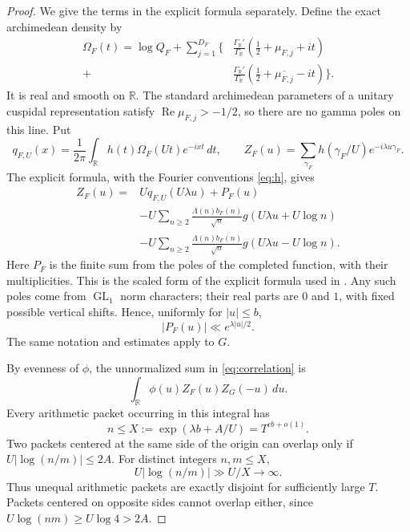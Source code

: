 \documentclass[11pt]{article}
\numberwithin{equation}{section}
\theoremstyle{remark}
\newcommand{\R}{\mathbb R}
\newcommand{\Rea}{\operatorname{Re}}
\newcommand{\GL}{\operatorname{GL}}
\begin{document}
\begin{proof}
We give the terms in the explicit formula separately. Define the exact
archimedean density by
\begin{equation}\label{eq:Omega}
\begin{split}
 \Omega_F(t)=\log Q_F+\sum_{j=1}^{D_F}\bigg\{
 &\frac{\Gamma_\R'}{\Gamma_\R}
             (\tfrac12+\mu_{F,j}+it)\\
 +&\frac{\Gamma_\R'}{\Gamma_\R}
             (\tfrac12+\overline{\mu_{F,j}}-it)\bigg\}.
\end{split}
\end{equation}
It is real and smooth on $\R$. The standard archimedean parameters of
a unitary cuspidal representation satisfy $\Rea\mu_{F,j}>-1/2$,
so there are no gamma poles on this line. Put
\[
 q_{F,U}(x)=\frac1{2\pi}\int_\R
                   h(t)\Omega_F(Ut)e^{-ixt}\,dt,
 \qquad Z_F(u)=\sum_{\gamma_F}h(\gamma_F/U)e^{-i\lambda u\gamma_F}.
\]
The explicit formula, with the Fourier conventions
\eqref{eq:h}, gives
\begin{equation}\label{eq:EF}
\begin{split}
 Z_F(u)={}&Uq_{F,U}(U\lambda u)+P_F(u)\\
 &-U\sum_{n\geq2}\frac{\Lambda(n)b_F(n)}{\sqrt n}
                          g(U\lambda u+U\log n)\\
 &-U\sum_{n\geq2}\frac{\Lambda(n)\overline{b_F(n)}}{\sqrt n}
                          g(U\lambda u-U\log n).
\end{split}
\end{equation}
Here $P_F$ is the finite sum from the poles of the completed function,
with their multiplicities. This is the scaled form of the explicit
formula used in \cite{RS}. Any such poles come from $\GL_1$ norm
characters; their real parts are $0$ and $1$, with fixed possible
vertical shifts. Hence, uniformly for $|u|\leq b$,
\begin{equation}\label{eq:Pbound}
 |P_F(u)|\ll e^{\lambda|u|/2}.
\end{equation}
The same notation and estimates apply to $G$.

By evenness of $\phi$, the unnormalized sum in
\eqref{eq:correlation} is
\begin{equation}\label{eq:rawintegral}
 \int_\R\phi(u)Z_F(u)Z_G(-u)\,du.
\end{equation}
Every arithmetic packet occurring in this integral has
\begin{equation}\label{eq:X}
 n\leq X:=\exp(\lambda b+A/U)=T^{cb+o(1)}.
\end{equation}
Two packets centered at the same side of the origin can overlap only if
$U|\log(n/m)|\leq2A$. For distinct integers $n,m\leq X$,
\[
 U|\log(n/m)|\gg U/X\longrightarrow\infty.
\]
Thus unequal arithmetic packets are exactly disjoint for sufficiently
large $T$. Packets centered on opposite sides cannot overlap either,
since $U\log(nm)\geq U\log4>2A$.


\end{proof}
\end{document}
